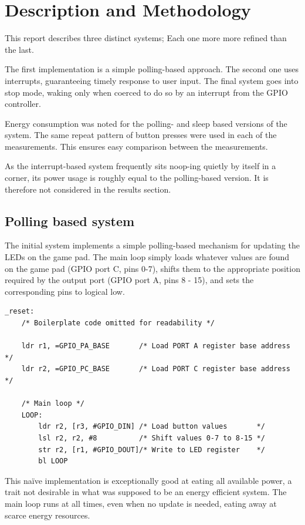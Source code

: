 \section{Description and Methodology}

This report describes three distinct systems; Each one more more refined than the last.

The first implementation is a simple polling-based approach. The second one uses interrupts, guaranteeing timely response to user input. The final system goes into stop mode, waking only when coerced to do so by an interrupt from the GPIO controller.

Energy consumption was noted for the polling- and sleep based versions of the system. The same repeat pattern of button presses were used in each of the measurements. This ensures easy comparison between the measurements.

As the interrupt-based system frequently sits noop-ing quietly by itself in a corner, its power usage is roughly equal to the polling-based version. It is therefore not considered in the results section. 

\subsection{Polling based system}
\label{subsection:polling}

The initial system implements a simple polling-based mechanism for updating the LEDs on the game pad. The main loop simply loads whatever values are found on the game pad (GPIO port C, pins 0-7), shifts them to the appropriate position required by the output port (GPIO port A, pins 8 - 15), and sets the corresponding pins to logical low.

\begin{lstlisting}[caption={Polling loop}, label={lst:polling-loop}]
_reset:
    /* Boilerplate code omitted for readability */

    ldr r1, =GPIO_PA_BASE       /* Load PORT A register base address    */
    ldr r2, =GPIO_PC_BASE       /* Load PORT C register base address    */

    /* Main loop */
    LOOP:
        ldr r2, [r3, #GPIO_DIN] /* Load button values       */
        lsl r2, r2, #8          /* Shift values 0-7 to 8-15 */
        str r2, [r1, #GPIO_DOUT]/* Write to LED register    */
        bl LOOP

\end{lstlisting}

This naïve implementation is exceptionally good at eating all available power, a trait not desirable in what was supposed to be an energy efficient system. The main loop runs at all times, even when no update is needed, eating away at scarce energy resources.


